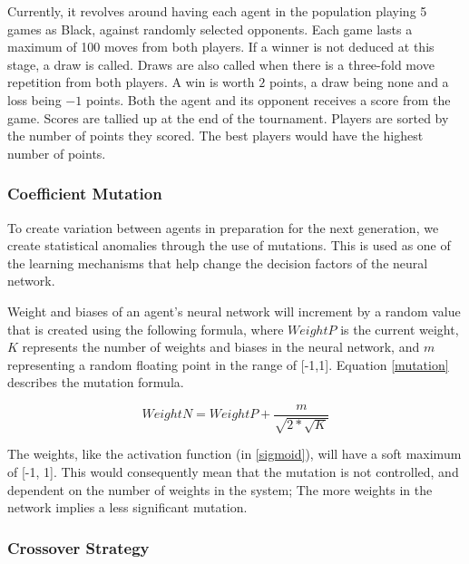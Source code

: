 \documentclass[12pt,a4paper]{article}
\begin{document}
    Currently, it revolves around having each agent in the population playing 5 games as Black, against randomly selected opponents. Each game lasts a maximum of 100 moves from both players. If a winner is not deduced at this stage, a draw is called. Draws are also called when there is a three-fold move repetition from both players. A win is worth $2$ points, a draw being none and a loss being $-1$ points. Both the agent and its opponent receives a score from the game.
    Scores are tallied up at the end of the tournament. Players are sorted by the number of points they scored. The best players would have the highest number of points.
    

\subsubsection{Coefficient Mutation} \label{coefficient_mutation}

    To create variation between agents in preparation for the next generation, we create statistical anomalies through the use of mutations. This is used as one of the learning mechanisms that help change the decision factors of the neural network.

    Weight and biases of an agent's neural network will increment by a random value that is created using the following formula, where $WeightP$ is the current weight, $K$ represents the number of weights and biases in the neural network, and $m$ representing a random floating point in the range of [-1,1]. Equation \ref{mutation} describes the mutation formula.

    \begin{equation} \label{mutation}
         WeightN = WeightP + \frac{m}{\sqrt{2 * \sqrt{K} }}
    \end{equation}

    The weights, like the activation function (in \ref{sigmoid}), will have a soft maximum of [-1, 1]. This would consequently mean that the mutation is not controlled, and dependent on the number of weights in the system; The more weights in the network implies a less significant mutation.

\subsubsection{Crossover Strategy} \label{crossover_strategy}
\end{document}
